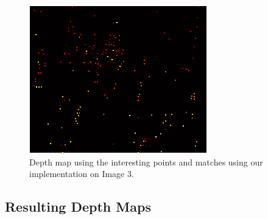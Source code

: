 \begin{figure}[H]\centering
	\includegraphics[width=0.8\linewidth]{Images/03_our_depth.png}
	\caption{Depth map using the interesting points and matches using our implementation on Image 3.}
	\label{fig:grid-example}
\end{figure}

\subsection{Resulting Depth Maps}
